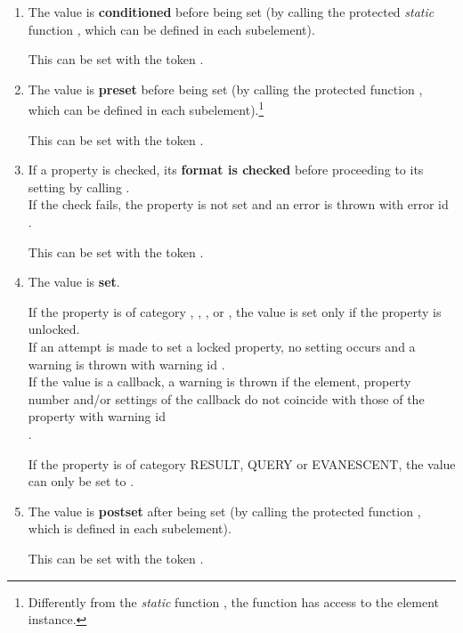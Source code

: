 \documentclass{tufte-handout}
\begin{document}
\begin{enumerate}
	\item The value is {\bf conditioned} before being set (by calling the protected \emph{static} function , which can be defined in each subelement).
	
	This can be set with the token .
	
	\item The value is {\bf preset} before being set (by calling the protected function , which can be defined in each subelement).\footnote{Differently from the \emph{static} function , the function  has access to the element instance.}

	This can be set with the token .
	
	\item If a property is checked, its {\bf format is checked} before proceeding to its setting by calling .\\
	If the check fails, the property is not set and an error is thrown with error id\\
	.
	
	This can be set with the token .

	\item The value is {\bf set}.

		If the property is of category , , , or , the value is set only if the property is unlocked.\\
		If an attempt is made to set a locked property, no setting occurs and a warning is thrown with warning id .\\
		If the value is a callback, a warning is thrown if the element, property number and/or settings of the callback do not coincide with those of the property with warning id\\
		.
 
		If the property is of category RESULT, QUERY or EVANESCENT, the value can only be set to .

	\item The value is {\bf postset} after being set (by calling the protected function , which is defined in each subelement).
	
	This can be set with the token .


\end{enumerate}
\end{document}
